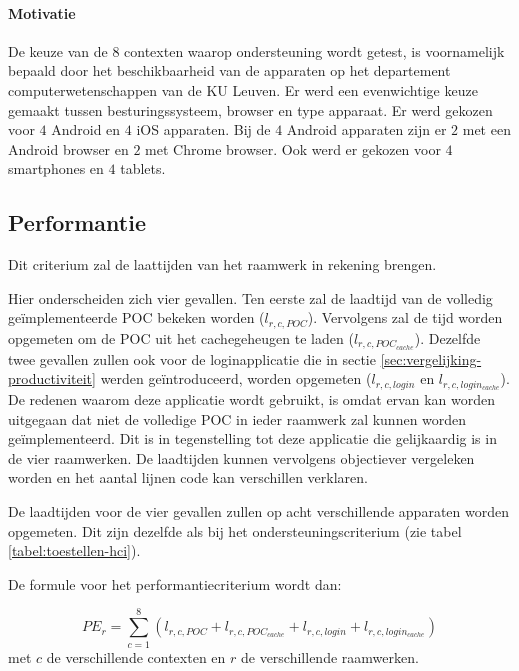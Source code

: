 \paragraph{Motivatie}
De keuze van de $8$ contexten waarop ondersteuning wordt getest, is voornamelijk bepaald door het beschikbaarheid van de apparaten op het departement computerwetenschappen van de KU Leuven.
Er werd een evenwichtige keuze gemaakt tussen besturingssysteem,  browser en type apparaat.
Er werd gekozen voor $4$ Android en $4$ iOS apparaten.
Bij de $4$ Android apparaten zijn er $2$ met een Android browser en $2$ met Chrome browser.
Ook werd er gekozen voor $4$ smartphones en $4$ tablets.


\subsection{Performantie}
\label{sec:vergelijking-performantie}
Dit criterium zal de laattijden van het raamwerk in rekening brengen.

Hier onderscheiden zich vier gevallen.
Ten eerste zal de laadtijd van de volledig geïmplementeerde POC bekeken worden ($l_{r,c,POC}$). 
Vervolgens zal de tijd worden opgemeten om de POC uit het cachegeheugen te laden ($l_{r,c,POC_{cache}}$).
Dezelfde twee gevallen zullen ook voor de loginapplicatie die in sectie \ref{sec:vergelijking-productiviteit} werden geïntroduceerd, worden opgemeten ($l_{r,c,login}$ en $l_{r,c,login_{cache}}$).
De redenen waarom deze applicatie wordt gebruikt, is omdat ervan kan worden uitgegaan dat niet de volledige POC in ieder raamwerk zal kunnen worden geïmplementeerd. 
Dit is in tegenstelling tot deze applicatie die gelijkaardig is in de vier raamwerken.
De laadtijden kunnen vervolgens objectiever vergeleken worden en het aantal lijnen code kan verschillen verklaren.

De laadtijden voor de vier gevallen zullen op acht verschillende apparaten worden opgemeten.
Dit zijn dezelfde als bij het ondersteuningscriterium (zie tabel \ref{tabel:toestellen-hci}).

De formule voor het performantiecriterium wordt dan: 

\begin{equation}
  PE_r= \sum_{c=1}^{8}{\left(l_{r,c,POC}+l_{r,c,POC_{cache}}+l_{r,c,login}+l_{r,c,login_{cache}}\right)} 
  \label{eq:performantie}
\end{equation}
met $c$ de verschillende contexten en $r$ de verschillende raamwerken.

